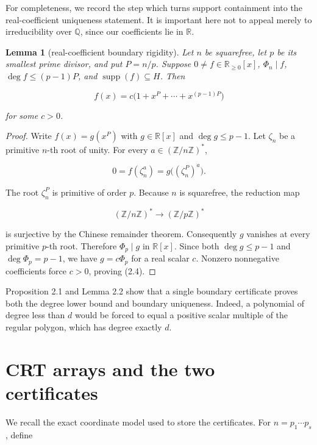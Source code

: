 \documentclass[11pt]{article}
\newtheorem{lemma}[theorem]{Lemma}
\numberwithin{equation}{section}
\begin{document}
For completeness, we record the step which turns support containment into the
real-coefficient uniqueness statement. It is important here not to appeal
merely to irreducibility over $\mathbb Q$, since our coefficients lie in
$\mathbb R$.

\Needspace{0.28\textheight}
\begin{lemma}[real-coefficient boundary rigidity]

Let $n$ be squarefree, let $p$ be its smallest prime divisor, and put $P=n/p$.
Suppose $0\ne f\in\mathbb R_{\geq0}[x]$, $\Phi_n\mid f$,
$\deg f\leq(p-1)P$, and $\operatorname{supp}(f)\subseteq H$. Then

\nopagebreak[4]
\[
f(x)=c\bigl(1+x^P+\cdots+x^{(p-1)P}\bigr)
\tag{2.4}
\]

for some $c>0$.

\end{lemma}

\begin{proof}

Write $f(x)=g(x^P)$ with $g\in\mathbb R[x]$ and $\deg g\leq p-1$. Let
$\zeta_n$ be a primitive $n$-th root of unity. For every
$a\in(\mathbb Z/n\mathbb Z)^*$,

\nopagebreak[4]
\[
0=f(\zeta_n^a)=g\bigl((\zeta_n^P)^a\bigr).
\]

The root $\zeta_n^P$ is primitive of order $p$. Because $n$ is squarefree,
the reduction map

\nopagebreak[4]
\[
(\mathbb Z/n\mathbb Z)^*\longrightarrow(\mathbb Z/p\mathbb Z)^*
\tag{2.5}
\]

is surjective by the Chinese remainder theorem. Consequently $g$ vanishes at
every primitive $p$-th root. Therefore $\Phi_p\mid g$ in $\mathbb R[x]$.
Since both $\deg g\leq p-1$ and $\deg\Phi_p=p-1$, we have
$g=c\Phi_p$ for a real scalar $c$. Nonzero nonnegative coefficients force
$c>0$, proving (2.4).
\end{proof}


Proposition 2.1 and Lemma 2.2 show that a single boundary certificate proves
both the degree lower bound and boundary uniqueness. Indeed, a polynomial of
degree less than $d$ would be forced to equal a positive scalar multiple of
the regular polygon, which has degree exactly $d$.

\section{CRT arrays and the two certificates}


We recall the exact coordinate model used to store the certificates. For
$n=p_1\cdots p_s$, define
\end{document}
